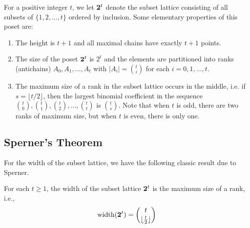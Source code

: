 For a positive integer $t$, we let $\mathbf{2}^t$ denote the subset
lattice consisting of all subsets of $\{1,2,\dots,t\}$
ordered by inclusion.  Some elementary properties of this
poset are:

\begin{enumerate}
\item The height is $t+1$ and all maximal chains have exactly
$t+1$ points.
\item The size of the poset $\mathbf{2}^t$ is $2^t$ and the elements
are partitioned into ranks (antichains) $A_0, A_1,\dots, A_t$
with $|A_i|=\binom{t}{i}$ for each $i=0,1,\dots,t$.
\item The maximum size of a rank in the subset lattice occurs
in the middle, i.e. if $s=\lfloor t/2\rfloor$, then the
largest binomial coefficient in the sequence $\binom{t}{0},
\binom{t}{1},\binom{t}{2},\dots,\binom{t}{t}$ is $\binom{t}{s}$.
Note that when $t$ is odd, there are two ranks of maximum size,
but when $t$ is even, there is only one.
\end{enumerate}

\subsection{Sperner's Theorem}\label{ss:posets:subset-lattice:sperner}

For the width of the subset lattice, we have the following
classic result due to Sperner.

\begin{theorem}[Sperner]\label{thm:sperner}
For each $t\ge1$, the width of the subset lattice $\mathbf{2}^t$
is the maximum size of a rank, i.e., 
\[
\operatorname{width}(\mathbf{2}^t)=\binom{t}{\lfloor\frac{t}{2}\rfloor}
\]
\end{theorem}

